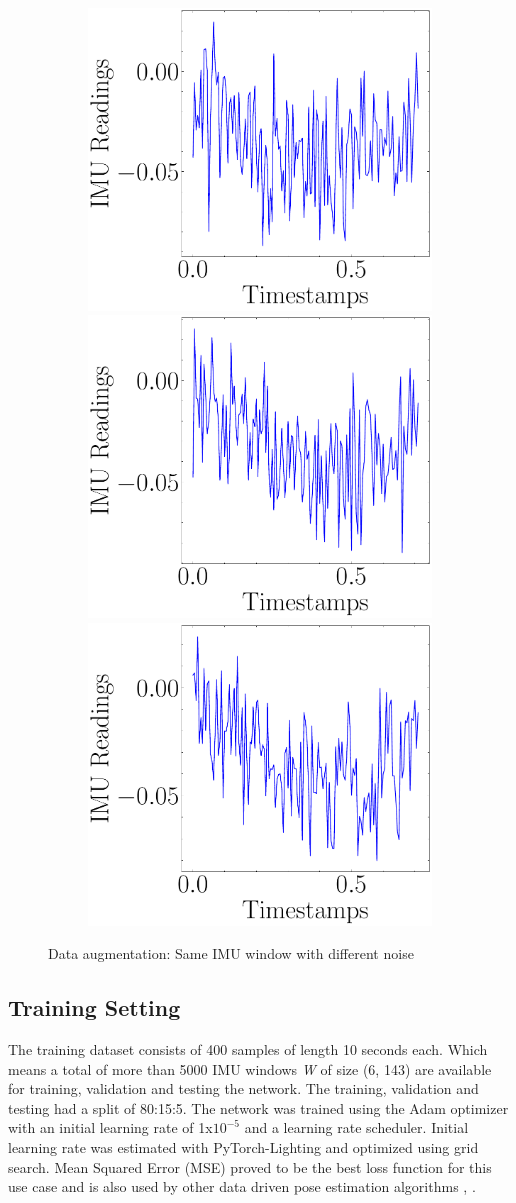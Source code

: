 \begin{figure}[H]
    \begin{subfigure}{\linewidth}
    \includegraphics[width=.3\linewidth]{images/fig_chapter4/imu_windows/same_window_diff_noise_3.pdf}\hfill
    \includegraphics[width=.3\linewidth]{images/fig_chapter4/imu_windows/same_window_diff_noise_4.pdf}\hfill
    \includegraphics[width=.3\linewidth]{images/fig_chapter4/imu_windows/same_window_diff_noise_5.pdf}\hfill
    \end{subfigure}
\caption{Data augmentation: Same IMU window with different noise}
\label{fig:data_augmentation}
\end{figure}


\subsection{Training Setting}
The training dataset consists of 400 samples of length 10 seconds each. Which means a total of more than 5000 IMU windows \textit{W} of size (6, 143) are available for training, validation and testing the network. The training, validation and testing had a split of 80:15:5. The network was trained using the Adam optimizer with an initial learning rate of 1x$ 10^{-5} $ and a learning rate scheduler. Initial learning rate was estimated with PyTorch-Lighting and optimized using grid search. Mean Squared Error (MSE) proved to be the best loss function for this use case and is also used by other data driven pose estimation algorithms \citep{yan2018ridi}, \citep{herath2020ronin}.

